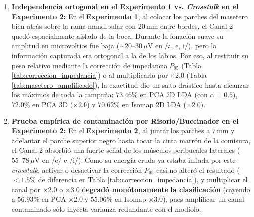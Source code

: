 \documentclass[11pt,a4paper]{article}
\begin{document}
\begin{enumerate}
    \item \textbf{Independencia ortogonal en el Experimento 1 vs. \textit{Crosstalk} en el Experimento 2:}
    En el \textbf{Experimento 1}, al colocar los parches del masetero bien atrás sobre la rama mandibular con $20\,\text{mm}$ entre bordes, el Canal 2 quedó espacialmente aislado de la boca. Durante la fonación suave su amplitud en microvoltios fue baja ($\sim 20\text{--}30\,\mu\text{V}$ en /a, e, i/), pero la información capturada era ortogonal a la de los labios. Por eso, al restituir su peso relativo mediante la corrección de impedancia $P_{95}$ (Tabla \ref{tab:correccion_impedancia}) o al multiplicarlo por $\mathbf{\times 2.0}$ (Tabla \ref{tab:masetero_amplificado}), la exactitud dio un salto drástico hasta alcanzar los máximos de toda la campaña: $\mathbf{73.46\%}$ en PCA 3D LDA (con $\alpha=0.5$), $\mathbf{72.0\%}$ en PCA 3D ($\times 2.0$) y $\mathbf{70.62\%}$ en Isomap 2D LDA ($\times 2.0$).
    \item \textbf{Prueba empírica de contaminación por Risorio/Buccinador en el Experimento 2:}
    En el \textbf{Experimento 2}, al juntar los parches a $7\,\text{mm}$ y adelantar el parche superior negro hasta tocar la cinta marrón de la comisura, el Canal 2 absorbió una fuerte señal de los músculos peribucales laterales ($55\text{--}78\,\mu\text{V}$ en /e/ e /i/). Como su energía cruda ya estaba inflada por este \textit{crosstalk}, activar o desactivar la corrección $P_{95}$ casi no alteró el resultado ($<1.5\%$ de diferencia en Tabla \ref{tab:correccion_impedancia}), y multiplicar el canal por $\times 2.0$ o $\times 3.0$ \textbf{degradó monótonamente la clasificación} (cayendo a $56.93\%$ en PCA $\times 2.0$ y $55.06\%$ en Isomap $\times 3.0$), pues amplificar un canal contaminado sólo inyecta varianza redundante con el modíolo.
\end{enumerate}
\end{document}
